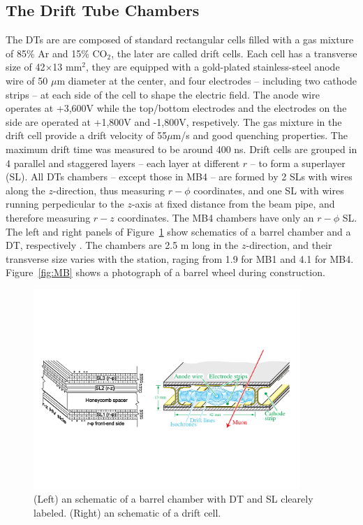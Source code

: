 \subsection{The Drift Tube Chambers}
The DTs are are composed of standard rectangular cells filled with a gas mixture of
85\% Ar and 15\% CO$_{2}$, the later are called drift cells. Each cell
has a transverse size of 42$\times$13 mm$^{2}$, they are equipped with
a gold-plated stainless-steel anode wire of 50 $\mu$m diameter at the
center, and four electrodes -- including two cathode strips -- at each
side of the cell to shape the electric field. The anode wire operates
at +3,600\unit{V} while the top/bottom electrodes and the electrodes
on the side are operated at +1,800\unit{V} and -1,800\unit{V},
respetively. The gas mixture in the drift cell provide a drift
velocity of 55$\mu$m/s and good quenching properties. The maximum
drift time was measured to be around 400 ns. Drift cells are grouped
in 4 parallel and staggered layers -- each layer at different $r$ --
to form a superlayer (SL). All DTs chambers -- except those in MB4 -- are formed by 2 SLs
with wires along the $z$-direction, thus measuring $r-\phi$
coordinates, and one SL with wires running perpedicular to the
$z$-axis at fixed distance from the beam pipe, and therefore measuring
$r-z$ coordinates. The MB4 chambers have only an $r-\phi$
SL. The left and right panels of Figure~\ref{fig:DTandSL} show schematics of a barrel chamber and
a DT, respectively . The
chambers are 2.5 m long in the $z$-direction, and their transverse
size varies with the station, raging from 1.9 for MB1 and 4.1 for
MB4. Figure~\ref{fig:MB} shows a photograph of a barrel wheel during
construction.
\begin{figure}
 \centering
\includegraphics[width=0.9\textwidth]{CMS_DetectorFigures/DriftTube.pdf}
\caption{(Left) an schematic of a barrel chamber with DT and SL
  clearely labeled. (Right) an schematic of a drift cell.\label{fig:DTandSL}}
\end{figure}
